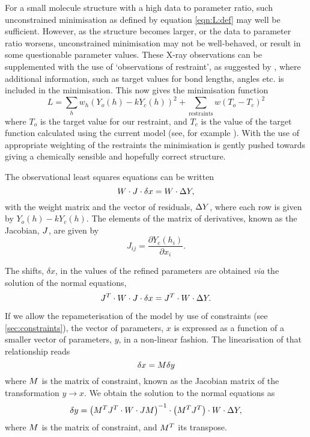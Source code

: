\documentclass[pdf]{iucr}
\begin{document}
For a small molecule structure with a high data to parameter ratio, such unconstrained minimisation as defined by equation \ref{eqn:L:def} may well be sufficient. However, as the structure becomes larger, or the data to parameter ratio worsens, unconstrained minimisation may not be well-behaved, or result in some questionable parameter values. These X-ray observations can be supplemented with the use of `observations of restraint', as suggested by \cite{Waser:a03999}, where additional information, such as target values for bond lengths, angles etc. is included in the minimisation. This now gives the minimisation function
\begin{equation}
L = \sum_h{ w_h} (Y_o(h) - k Y_c(h))^2 + \sum_\text{restraints} w (T_o- T_c)^2
\label{eqn:L_restraints_def}
\end{equation}
where $T_o$ is the target value for our restraint, and $T_c$ is the value of the target function calculated using the current model (see, for example \cite{Giacovazzo:2002,Watkin:kk5025}). With the use of appropriate weighting of the restraints the minimisation is gently pushed towards giving a chemically sensible and hopefully correct structure.

The observational least squares equations can be written
\begin{equation}
W \cdot J \cdot \delta x = W \cdot \Delta Y
\label{eqn:},
\end{equation}
with the weight matrix and the vector of residuals, $\Delta Y$, where each row is given by $Y_o(h) - k Y_c(h)$. The elements of the matrix of derivatives, known as the Jacobian, $J$, are given by
\begin{equation}
J_{ij} = \frac{\partial Y_c(h_i)}{\partial x_i}.
\label{eqn:}
\end{equation}

The shifts, $\delta x$, in the values of the refined parameters are obtained \emph{via} the solution of the normal equations,
\begin{equation}
J^T \cdot W \cdot J \cdot \delta x = J^T \cdot W \cdot \Delta Y
\label{eqn:}.
\end{equation}

If we allow the repameterisation of the model by use of constraints (see \textsection\ref{sec:constraints}), the vector of parameters, $x$ is expressed as a function of a smaller vector of parameters, $y$, in a non-linear fashion. The linearisation of that relationship reads
\begin{equation}
\delta x = M \delta y
\label{eqn:}
\end{equation}
where $M$ is the matrix of constraint, known as the Jacobian matrix of the transformation $y \rightarrow x$.
We obtain the solution to the normal equations as
\begin{equation}
\delta y = \left( M^T J^T \cdot W \cdot J M \right)^{-1} \cdot \left( M^T J^T \right) \cdot W \cdot \Delta Y
\label{eqn:},
\end{equation}
where $M$ is the matrix of constraint, and $M^T$ its transpose.
\end{document}
